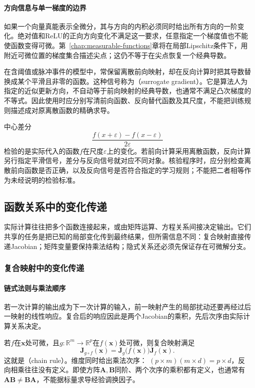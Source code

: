 \paragraph{方向信息与单一梯度的边界}

如果一个向量真能表示全微分，其与方向的内积必须同时给出所有方向的一阶变化。绝对值和ReLU的正向方向变化不满足这一要求，任意指定一个梯度值也不能使函数变得可微。第~\ref{chap:measurable-functions}章将在局部Lipschitz条件下，用附近可微位置的梯度集合描述尖点；这仍不等于在尖点恢复一个经典导数。


在含阈值或脉冲事件的模型中，常保留离散前向映射，却在反向计算时把其导数替换成某个平滑且非零的函数。这种信号称为（surrogate gradient）。它是算法人为指定的近似更新方向，不自动等于前向映射的经典导数，也通常不满足凸次梯度的不等式。因此使用时应分别写清前向函数、反向替代函数及其尺度，不能把训练规则描述成对原离散函数的精确求导。

中心差分
\[   \frac{f(x+\varepsilon)-f(x-\varepsilon)}{2\varepsilon} \]
检验的是实际代入的函数$f$在尺度$\varepsilon$上的变化。若前向计算采用离散函数，反向计算另行指定平滑信号，差分与反向信号就对应不同对象。核验程序时，应分别检查离散前向函数是否正确，以及反向信号是否符合指定的学习规则；不能把二者相等作为未经说明的检验标准。

\subsection{函数关系中的变化传递}
\label{sec:analysis-vector-chain-matrix-calculus}

实际计算往往把多个函数连接起来，或由矩阵运算、方程关系间接决定输出。它们共享的任务是把已知的局部变化传到最终结果，但所需信息不同：复合映射直接传递Jacobian；矩阵变量要保持乘法结构；隐式关系还必须先保证存在可微解分支。

\subsubsection{复合映射中的变化传递}

\paragraph{链式法则与乘法顺序}

若一次计算的输出成为下一次计算的输入，前一映射产生的局部扰动还要再经过后一映射的线性响应。复合后的响应因此是两个Jacobian的乘积，先后次序由实际计算关系决定。

若$f$在$\bm{x}$处可微，且$g:\mathbb{R}^m\to\mathbb{R}^p$在$f(\bm{x})$处可微，则复合映射满足
\begin{equation}
  \bm{J}_{g\circ f}(\bm{x})
  =
  \bm{J}_g\bigl(f(\bm{x})\bigr)\bm{J}_f(\bm{x}).
\label{eq:analysis-vector-chain-rule}
\end{equation}
这就是（chain rule）。维度同时给出乘法次序： $(p\times m)(m\times d)=p\times d$，反向相乘往往没有定义。即使方阵$\bm A,\bm B$同阶、两个次序的乘积都有定义，也通常有$\bm A\bm B\neq\bm B\bm A$，不能据标量求导经验调换因子。

